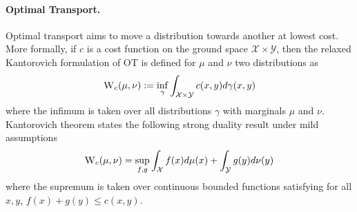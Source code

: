 \paragraph{Optimal Transport.} Optimal transport aims to move a distribution towards another at lowest cost. More formally, if $c$ is a cost function on the ground space $\mathcal{X}\times\mathcal{Y}$, then the relaxed Kantorovich formulation of OT is defined for $\mu$ and $\nu$ two distributions as $$\textsc{W}_c(\mu,\nu) := \inf_{\gamma} \int_{\mathcal{X}\times\mathcal{Y}}c(x,y)d\gamma(x,y)$$
where the infimum is taken over all distributions $\gamma$ with marginals $\mu$ and $\nu$. Kantorovich theorem  states the following strong duality result under mild assumptions~\citep{villani2003topics}
$$\textsc{W}_c(\mu,\nu) = \sup_{f,g} \int_{\mathcal{X}}f(x)d\mu(x) + \int_{\mathcal{Y}}g(y)d\nu(y)$$
where the supremum is taken over continuous bounded functions satisfying for all $x,y$,  $f(x)+g(y)\leq c(x,y)$.
